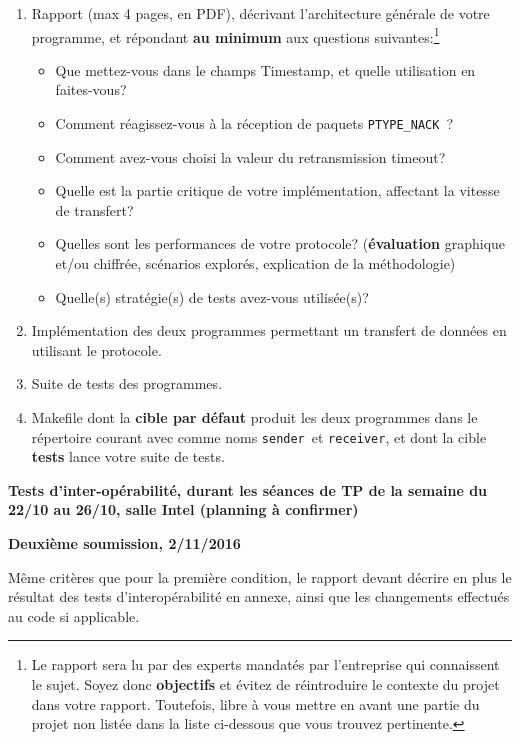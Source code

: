 \documentclass[a4paper,12pt]{article}
\newcommand{\pnack}{\texttt{PTYPE\_NACK}}
\newcommand{\sender}{\texttt{sender}}
\newcommand{\receiver}{\texttt{receiver}}
\begin{document}
\begin{enumerate}
    \item Rapport (max 4 pages, en PDF), décrivant l'architecture générale de votre
        programme, et répondant \textbf{au minimum} aux questions suivantes:\footnote{Le rapport sera lu par des experts mandatés par l'entreprise qui connaissent le sujet. Soyez donc \textbf{objectifs} et évitez de réintroduire le contexte du projet dans votre rapport. Toutefois, libre à vous mettre en avant une partie du projet non listée dans la liste ci-dessous que vous trouvez pertinente.}
        \begin{itemize}
            \item Que mettez-vous dans le champs Timestamp, et quelle
                utilisation en faites-vous?
            \item Comment réagissez-vous à la réception de paquets \pnack\ ?
            \item Comment avez-vous choisi la valeur du retransmission timeout?
            \item Quelle est la partie critique de votre implémentation, affectant
                la vitesse de transfert?
            \item Quelles sont les performances de votre protocole? (\textbf{évaluation} graphique et/ou chiffrée, scénarios explorés, explication de la méthodologie)
            \item Quelle(s) stratégie(s) de tests avez-vous utilisée(s)?
        \end{itemize}
    \item Implémentation des deux programmes permettant un transfert de données en
        utilisant le protocole.	
    \item Suite de tests des programmes.
    \item Makefile dont la \textbf{cible par défaut} produit les deux programmes
        dans le répertoire courant avec comme noms \sender\ et \receiver, et
        dont la cible \textbf{tests} lance votre suite de tests.
\end{enumerate}

\medskip
\textbf{Tests d'inter-opérabilité, durant les séances de TP de la semaine du 22/10 au 26/10, salle Intel (planning à confirmer)}
\medskip

\medskip
\textbf{Deuxième soumission, 2/11/2016}

Même critères que pour la première condition, le rapport devant décrire en plus
le résultat des tests d'interopérabilité en annexe, ainsi que les changements
effectués au code si applicable.
\end{document}
